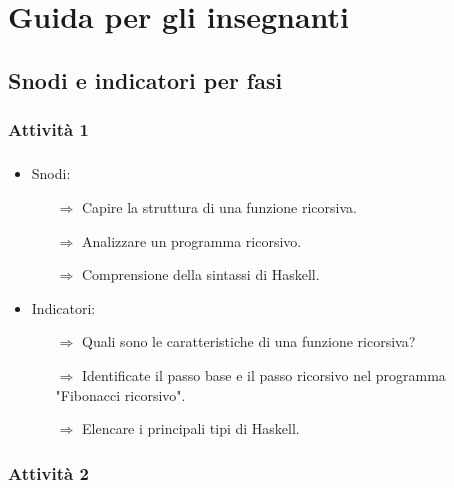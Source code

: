 \chapter{Guida per gli insegnanti}

\section{Snodi e indicatori per fasi}

\subsection{Attività 1}

\paragraph{}

\begin{itemize}
    \item Snodi:
    \begin{itemize}
        \item [$\Rightarrow$] Capire la struttura di una funzione ricorsiva.
        \item [$\Rightarrow$] Analizzare un programma ricorsivo.
        \item [$\Rightarrow$] Comprensione della sintassi di Haskell.
    \end{itemize}
    \item Indicatori:
    \begin{itemize}
        \item [$\Rightarrow$] Quali sono le caratteristiche di una funzione ricorsiva?
        \item [$\Rightarrow$] Identificate il passo base e il passo ricorsivo nel programma
                              "Fibonacci ricorsivo".
        \item [$\Rightarrow$] Elencare i principali tipi di Haskell.
    \end{itemize}
\end{itemize}

\subsection{Attività 2}

\paragraph{}

